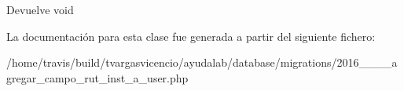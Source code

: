 \begin{DoxyReturn}{\-Devuelve}
void 
\end{DoxyReturn}


\-La documentación para esta clase fue generada a partir del siguiente fichero\-:\begin{DoxyCompactItemize}
\item 
/home/travis/build/tvargasvicencio/ayudalab/database/migrations/2016\-\_\-\_\-\_\-\_\-agregar\-\_\-campo\-\_\-rut\-\_\-inst\-\_\-a\-\_\-user.\-php\end{DoxyCompactItemize}
